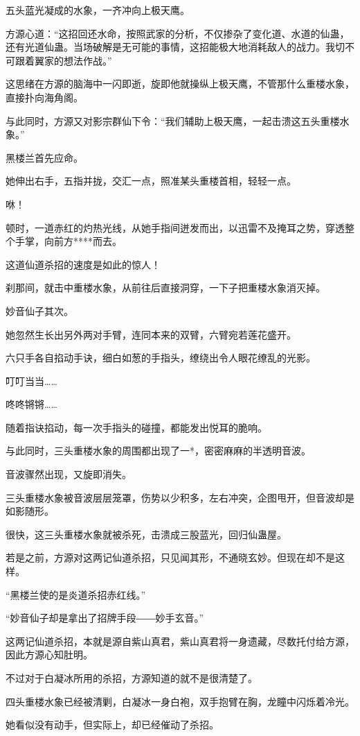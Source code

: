 \begin{this_body}
五头蓝光凝成的水象，一齐冲向上极天鹰。

方源心道：“这招回还水命，按照武家的分析，不仅掺杂了变化道、水道的仙蛊，还有光道仙蛊。当场破解是无可能的事情，这招能极大地消耗敌人的战力。我切不可跟着翼家的想法作战。”

这思绪在方源的脑海中一闪即逝，旋即他就操纵上极天鹰，不管那什么重楼水象，直接扑向海角阁。

与此同时，方源又对影宗群仙下令：“我们辅助上极天鹰，一起击溃这五头重楼水象。”

黑楼兰首先应命。

她伸出右手，五指并拢，交汇一点，照准某头重楼首相，轻轻一点。

咻！

顿时，一道赤红的灼热光线，从她手指间迸发而出，以迅雷不及掩耳之势，穿透整个手掌，向前方****而去。

这道仙道杀招的速度是如此的惊人！

刹那间，就击中重楼水象，从前往后直接洞穿，一下子把重楼水象消灭掉。

妙音仙子其次。

她忽然生长出另外两对手臂，连同本来的双臂，六臂宛若莲花盛开。

六只手各自掐动手诀，细白如葱的手指头，缭绕出令人眼花缭乱的光影。

叮叮当当……

咚咚锵锵……

随着指诀掐动，每一次手指头的碰撞，都能发出悦耳的脆响。

与此同时，三头重楼水象的周围都出现了一*，密密麻麻的半透明音波。

音波骤然出现，又旋即消失。

三头重楼水象被音波层层笼罩，伤势以少积多，左右冲突，企图甩开，但音波却是如影随形。

很快，这三头重楼水象就被杀死，击溃成三股蓝光，回归仙蛊屋。

若是之前，方源对这两记仙道杀招，只见闻其形，不通晓玄妙。但现在却不是这样。

“黑楼兰使的是炎道杀招赤红线。”

“妙音仙子却是拿出了招牌手段――妙手玄音。”

这两记仙道杀招，本就是源自紫山真君，紫山真君将一身遗藏，尽数托付给方源，因此方源心知肚明。

不过对于白凝冰所用的杀招，方源知道的就不是很清楚了。

四头重楼水象已经被清剿，白凝冰一身白袍，双手抱臂在胸，龙瞳中闪烁着冷光。

她看似没有动手，但实际上，却已经催动了杀招。


\end{this_body}
